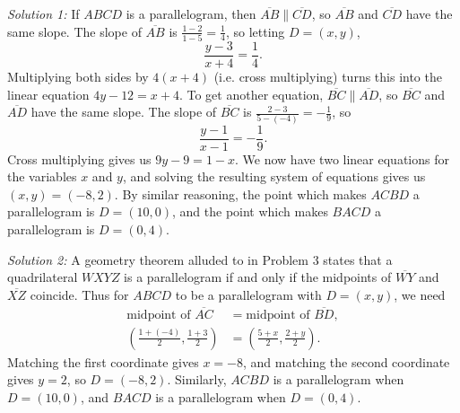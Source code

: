 \begin{enumerate}
\emph{Solution 1:} If $ABCD$ is a parallelogram, then $\overline{AB}\parallel\overline{CD}$, so $\overline{AB}$ and $\overline{CD}$ have the same slope. The slope of $\overline{AB}$ is $\frac{1 - 2}{1 - 5} = \frac{1}{4}$, so letting $D = (x,y)$,
\begin{equation*}
\frac{y - 3}{x + 4} = \frac{1}{4}.
\end{equation*}
Multiplying both sides by $4(x + 4)$ (i.e. cross multiplying) turns this into the linear equation $4y - 12 = x + 4$. To get another equation, $\overline{BC}\parallel\overline{AD}$, so $\overline{BC}$ and $\overline{AD}$ have the same slope. The slope of $\overline{BC}$ is $\frac{2 - 3}{5 - (-4)} = -\frac{1}{9}$, so 
\begin{equation*}
\frac{y - 1}{x - 1} = -\frac{1}{9}.
\end{equation*}
Cross multiplying gives us $9y - 9 = 1 - x$. We now have two linear equations for the variables $x$ and $y$, and solving the resulting system of equations gives us $(x,y) = \boxed{(-8,2)}$. By similar reasoning, the point which makes $ACBD$ a parallelogram is $D = \boxed{(10,0)}$, and the point which makes $BACD$ a parallelogram is $D = \boxed{(0,4)}$.\par 
\emph{Solution 2:} A geometry theorem alluded to in Problem 3 states that a quadrilateral $WXYZ$ is a parallelogram if and only if the midpoints of $\overline{WY}$ and $\overline{XZ}$ coincide. Thus for $ABCD$ to be a parallelogram with $D = (x,y)$, we need
\begin{align*}
\text{midpoint of }\overline{AC} &= \text{midpoint of }\overline{BD}, \\
\left(\frac{1 + (-4)}{2}, \frac{1 + 3}{2}\right) &= \left(\frac{5 + x}{2}, \frac{2 + y}{2}\right).
\end{align*}
Matching the first coordinate gives $x = -8$, and matching the second coordinate gives $y = 2$, so $D = \boxed{(-8,2)}$. Similarly, $ACBD$ is a parallelogram when $D = \boxed{(10,0)}$, and $BACD$ is a parallelogram when $D = \boxed{(0,4)}$.
\end{enumerate}